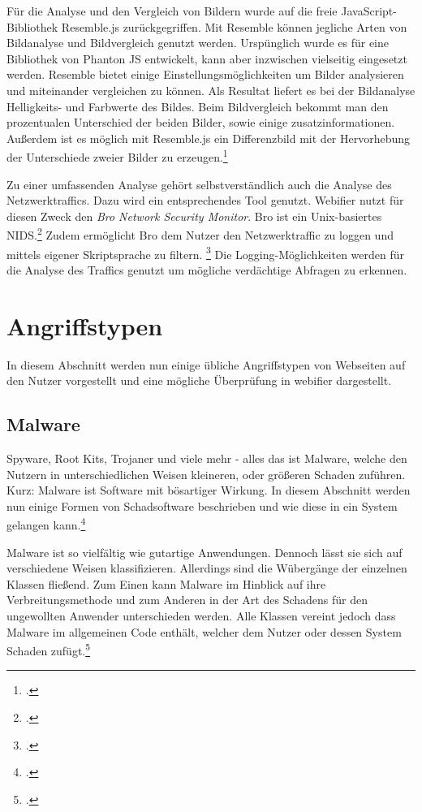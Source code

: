 Für die Analyse und den Vergleich von Bildern wurde auf die freie JavaScript-Bibliothek Resemble.js zurückgegriffen. Mit Resemble können jegliche Arten von Bildanalyse und Bildvergleich genutzt werden. Urspünglich wurde es für eine Bibliothek von Phanton JS entwickelt, kann aber inzwischen vielseitig eingesetzt werden. Resemble bietet einige Einstellungsmöglichkeiten um Bilder analysieren und miteinander vergleichen zu können. Als Resultat liefert es bei der Bildanalyse Helligkeits- und Farbwerte des Bildes. Beim Bildvergleich bekommt man den prozentualen Unterschied der beiden Bilder, sowie einige zusatzinformationen. Außerdem ist es möglich mit Resemble.js ein Differenzbild mit der Hervorhebung der Unterschiede zweier Bilder zu erzeugen.\footcite[Vgl.][]{resemblejs}

Zu einer umfassenden Analyse gehört selbstverständlich auch die Analyse des Netzwerktraffics. Dazu wird ein entsprechendes Tool genutzt. Webifier nutzt für diesen Zweck den \textit{Bro Network Security Monitor}. Bro ist ein Unix-basiertes \ac{NIDS}.\footcite[Vgl.][199]{bro} Zudem ermöglicht Bro dem Nutzer den Netzwerktraffic zu loggen und mittels eigener Skriptsprache zu filtern. \footcite{bro2} Die Logging-Möglichkeiten werden für die Analyse des Traffics genutzt um mögliche verdächtige Abfragen zu erkennen.


\section{Angriffstypen}

In diesem Abschnitt werden nun einige übliche Angriffstypen von Webseiten auf den Nutzer vorgestellt und eine mögliche Überprüfung in webifier dargestellt.

\subsection{Malware}

Spyware, Root Kits, Trojaner und viele mehr - alles das ist Malware, welche den Nutzern in unterschiedlichen Weisen kleineren, oder größeren Schaden zuführen. Kurz: Malware ist Software mit bösartiger Wirkung. In diesem Abschnitt werden nun einige Formen von Schadsoftware beschrieben und wie diese in ein System gelangen kann.\footcite[Vgl.][95]{netzwerkDatensicherheit}

Malware ist so vielfältig wie gutartige Anwendungen. Dennoch lässt sie sich auf verschiedene Weisen klassifizieren. Allerdings sind die Wübergänge der einzelnen Klassen fließend. Zum Einen kann Malware im Hinblick auf ihre Verbreitungsmethode und zum Anderen in der Art des Schadens für den ungewollten Anwender unterschieden werden. Alle Klassen vereint jedoch dass Malware im allgemeinen Code enthält, welcher dem Nutzer oder dessen System Schaden zufügt.\footcite[Vgl.][95\psq]{netzwerkDatensicherheit}

